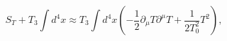 \begin{equation}
S_{T}+T_{3}\int d^{4}x \approx 
T_{3}\int d^{4}x\left(-\frac{1}{2}\partial_{\mu}T
\partial^{\mu}T+\frac{1}{2T_{0}^{2}}T^{2}\right),
\end{equation}

